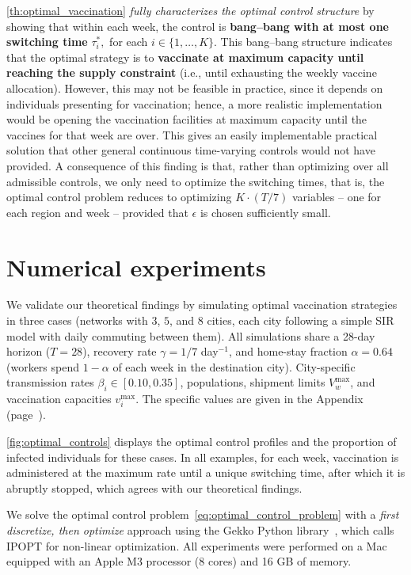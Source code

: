 \documentclass[letterpaper, 10 pt, conference]{ieeeconf}
\newcommand{\fori}[1]{#1 \in \{1,\dots, K\}}
\begin{document}
\autoref{th:optimal_vaccination} {\it fully characterizes the optimal control structure} by showing that within each week, the control is {\bf bang--bang with at most one switching time} $\tau_i^*,$ for each $\fori{i}$.
This bang--bang structure indicates that the optimal strategy is to {\bf vaccinate at maximum capacity until reaching the supply constraint} (i.e., until exhausting the weekly vaccine allocation).
However, this may not be feasible in practice, since it depends on individuals presenting for vaccination; hence, a more realistic implementation would be opening the vaccination facilities at maximum capacity until the vaccines for that week are over.
This gives an easily implementable practical solution that other general continuous time-varying controls would not have provided. 
A consequence of this finding is that, rather than optimizing over all admissible controls, we only need to optimize the switching times, that is, the optimal control problem reduces to optimizing \(K\cdot(T/7)\) variables -- one for each region and week -- provided that $\epsilon$ is chosen sufficiently small.

\section{Numerical experiments}
\label{sec:numerics}

We validate our theoretical findings by simulating optimal vaccination strategies in three cases (networks with $3$, $5$, and $8$ cities, each city following a simple SIR model with daily commuting
between them).
All simulations share a 28-day horizon (\(T=28\)), recovery rate
\(\gamma=1/7\) day\(^{-1}\), and home-stay fraction
\(\alpha=0.64\) (workers spend \(1-\alpha\) of each week in the
destination city).  
City-specific transmission rates \(\beta_i\in[0.10,0.35]\), populations, shipment limits \(V^{\max}_w\), and vaccination capacities \(v_i^{\max}\).
The specific values are given in the Appendix (page~\pageref{appendix:parameters}).

\autoref{fig:optimal_controls} displays the optimal control profiles and the proportion of infected individuals for these cases. 
In all examples, for each week, vaccination is administered at the maximum rate until a unique switching time, after which it is abruptly stopped, which agrees with our theoretical findings.

We solve the optimal control problem~\eqref{eq:optimal_control_problem} with a {\it first discretize, then optimize\/} approach using the Gekko Python library~\cite{beal2018gekko}, which calls IPOPT for non-linear optimization.
All experiments were performed on a Mac equipped with an Apple M3 processor (8 cores) and 16 GB of memory.
\end{document}
